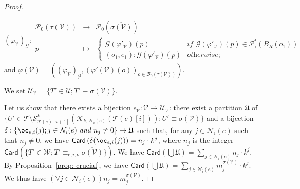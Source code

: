 \documentclass{article}
\theoremstyle{plain}
\newcommand{\nontrivialconnected}[3]{\mathcal{S}_{#1}^{#3}(#2)}
\newcommand{\taylor}[2]{\mathcal{T}(#1)[#2]}
\newcommand{\criticalports}[3]{\mathcal{K}_{#2, #3}(#1)}
\newcommand{\groundof}[1]{\mathcal{G}(#1)}
\newcommand{\cod}{\oc}
\newcommand{\portsatzero}[1]{\mathcal{P}_0(#1)}
\newcommand{\Card}[1]{\textsf{Card}\left( #1 \right)}
\newcommand{\conclusionscirc}[1]{\mathcal{P}_\circ^{\textsf{f}}(#1)}
\newcommand{\boxesatzero}[1]{\mathcal{B}_{0}(#1)}
\begin{document}
\begin{proof}
\begin{itemize}
$(\varphi_\mathcal{V})_{\mathcal{G}} : \begin{array}{rcl} 
\portsatzero{\tau(\mathcal{V})} & \to & \portsatzero{\overline{\sigma(\mathcal{V})}} \\ 
p & \mapsto & \left\lbrace \begin{array}{ll} \groundof{\varphi'_{\mathcal{V}}}(p) & \textit{if $\groundof{\varphi'_{\mathcal{V}}}(p) \in \conclusionscirc{B_R(o_1)}$}\\ (o_1, e_1):\groundof{\varphi'_{\mathcal{V}}}(p) & \textit{otherwise;} \end{array} \right. \end{array}$ and $\varphi(\mathcal{V}) = ((\varphi_{\mathcal{V}})_{\mathcal{G}}, (\varphi'(\mathcal{V})(o))_{o \in \boxesatzero{\tau(\mathcal{V})}})$.
\end{itemize}

We set $\mathcal{U}_{\mathcal{V}} = \{ T' \in \mathcal{U} ; T' \equiv \sigma(\mathcal{V}) \}$.

Let us show that there exists a bijection $\epsilon_{\mathcal{V}} : \mathcal{V} \to \mathcal{U}_{\mathcal{V}}$: 
there exist a partition $\mathfrak{U}$ of $\{ U' \in \mathcal{T} \setminus \nontrivialconnected{\taylor{e}{i+1}}{\criticalports{\taylor{e}{i}}{k}{\mathcal{N}_i(e)}}{k} ; U' \equiv \sigma(\mathcal{V}) \}$ and a bijection $\delta: \{ \cod_{e, i}(j) ; j \in \mathcal{N}_i(e) \textit{ and } n_j \not= 0 \} \to \mathfrak{U}$ such that, for any $j \in \mathcal{N}_i(e)$ such that $n_j \not= 0$, we have $\Card{\delta(\cod_{e, i}(j))} = n_j \cdot k^j$, where $n_j$ is the integer $\Card{\{ T' \in \mathcal{W} ; T' \equiv_{e, i, o} \overline{\sigma(\mathcal{V})} \}}$. We have $\Card{\bigcup \mathfrak{U}} = \sum_{j \in \mathcal{N}_i(e)} n_j \cdot k^j$. By Proposition~\ref{prop: crucial}, we have $\Card{\bigcup \mathfrak{U}}= \sum_{j \in \mathcal{N}_i(e)} m_j^{\sigma(\mathcal{V})} \cdot k^j$. We thus have $(\forall j \in \mathcal{N}_i(e)) n_j = m_j^{\sigma(\mathcal{V})}$.


\end{proof}
\end{document}
